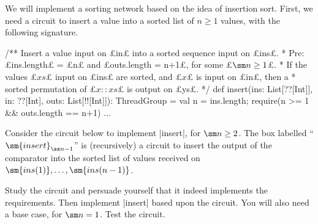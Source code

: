 \begin{question}
We will  implement a sorting network based on the idea of insertion sort.
%
First, we need a circuit to insert a value into a sorted list of
$n \ge 1$ values, with the following signature.
%
\begin{mysamepage}
\begin{scala}
  /** Insert a value input on £in£ into a sorted sequence input on £ins£. 
    * Pre: £ins.length£ = £n£ and £outs.length = n+1£, for some £$\sm n \ge 1$£.
    * If the values £$xs$£ input on £ins£ are sorted, and £$x$£ is input on £in£, then a
    * sorted permutation of £$x::xs$£ is output on £ys£. */
  def insert(ins: List[??[Int]], in: ??[Int], outs: List[!![Int]]): ThreadGroup = {
    val n = ins.length; require(n >= 1 && outs.length == n+1)
    ...
  }
\end{scala}
\end{mysamepage}
%
Consider the circuit below to implement |insert|, for $\sm n \ge 2$.  The box
labelled ``$\sm{insert}_{\ss n-1}$'' is (recursively) a circuit to insert the
output of the comparator into the sorted list of values received on
$\sm{ins(1)}, \ldots, \sm{ins(n-1)}$. %
%
%
\begin{center}
\def\width{6.5} %
\def\recX{2} %
\def\recWidth{3} %
\def\recEnd{\recX+\recWidth} %
\end{center}
%
\begin{qpart}
\label{Q:insert1}
Study the circuit and persuade yourself that it indeed implements the
requirements.  Then implement |insert| based upon the circuit.  You will also
need a base case, for $\sm n = 1$.  Test the circuit.
\end{qpart}


\end{question}
